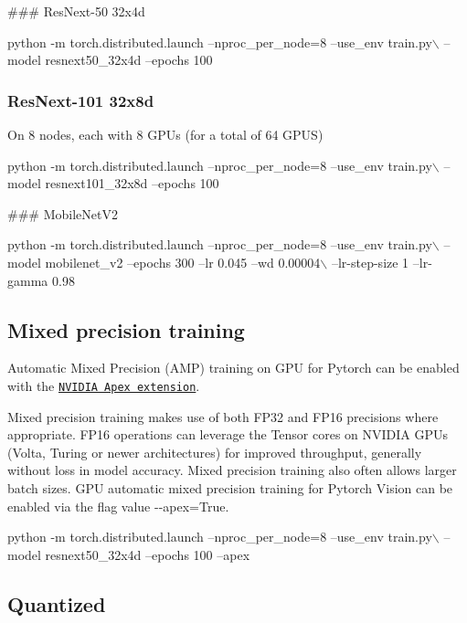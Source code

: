 \#\#\# Res\+Next-\/50 32x4d 
\begin{DoxyCode}
python -m torch.distributed.launch --nproc\_per\_node=8 --use\_env train.py\(\backslash\)
    --model resnext50\_32x4d --epochs 100
\end{DoxyCode}


\subsubsection*{Res\+Next-\/101 32x8d}

On 8 nodes, each with 8 G\+P\+Us (for a total of 64 G\+P\+US) 
\begin{DoxyCode}
python -m torch.distributed.launch --nproc\_per\_node=8 --use\_env train.py\(\backslash\)
    --model resnext101\_32x8d --epochs 100
\end{DoxyCode}


\#\#\# Mobile\+Net\+V2 
\begin{DoxyCode}
python -m torch.distributed.launch --nproc\_per\_node=8 --use\_env train.py\(\backslash\)
     --model mobilenet\_v2 --epochs 300 --lr 0.045 --wd 0.00004\(\backslash\)
     --lr-step-size 1 --lr-gamma 0.98
\end{DoxyCode}


\subsection*{Mixed precision training}

Automatic Mixed Precision (A\+MP) training on G\+PU for Pytorch can be enabled with the \href{https://github.com/NVIDIA/apex}{\tt N\+V\+I\+D\+IA Apex extension}.

Mixed precision training makes use of both F\+P32 and F\+P16 precisions where appropriate. F\+P16 operations can leverage the Tensor cores on N\+V\+I\+D\+IA G\+P\+Us (Volta, Turing or newer architectures) for improved throughput, generally without loss in model accuracy. Mixed precision training also often allows larger batch sizes. G\+PU automatic mixed precision training for Pytorch Vision can be enabled via the flag value {\ttfamily -\/-\/apex=True}.


\begin{DoxyCode}
python -m torch.distributed.launch --nproc\_per\_node=8 --use\_env train.py\(\backslash\)
    --model resnext50\_32x4d --epochs 100 --apex
\end{DoxyCode}


\subsection*{Quantized}

